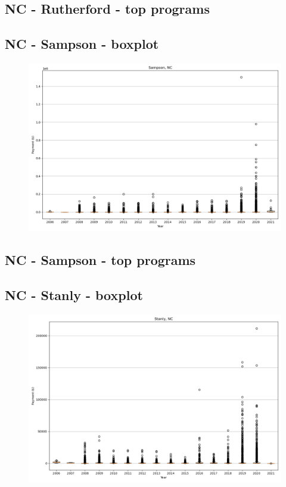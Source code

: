 \subsection*{NC - Rutherford - top programs}

\newpage
\subsection*{NC - Sampson - boxplot}
\begin{figure}[h]
\centering
\includegraphics[width=7in]{../output/boxplots/counties/Sampson-NC_boxplot.png}
\end{figure}


\subsection*{NC - Sampson - top programs}

\newpage
\subsection*{NC - Stanly - boxplot}
\begin{figure}[h]
\centering
\includegraphics[width=7in]{../output/boxplots/counties/Stanly-NC_boxplot.png}
\end{figure}


